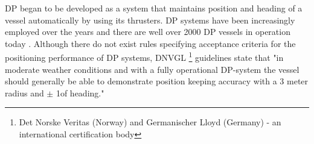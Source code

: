 %
%

DP began to be developed as a system that maintains position and heading of a vessel automatically by using its thrusters. DP systems have been increasingly employed over the years and there are well over 2000 DP vessels in operation today \parencite{sorensen2011survey}. Although there do not exist rules specifying acceptance criteria for the positioning performance of DP systems, DNVGL \footnote{Det Norske Veritas (Norway) and Germanischer Lloyd (Germany) - an international certification body} guidelines state that "in moderate weather conditions and with a fully operational DP-system the vessel should generally be able to demonstrate position keeping accuracy with a 3 meter radius and $ \pm $ 1\degree of heading." \parencite{veritas2011dynamic} 


